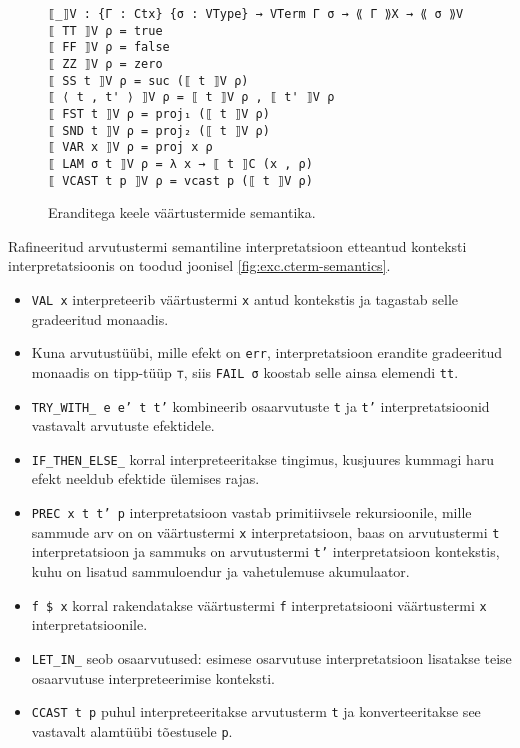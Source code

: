 \documentclass[a4paper,12pt]{article}
\begin{document}
\begin{figure}
  \begin{BVerbatim}
⟦_⟧V : {Γ : Ctx} {σ : VType} → VTerm Γ σ → ⟪ Γ ⟫X → ⟪ σ ⟫V
⟦ TT ⟧V ρ = true
⟦ FF ⟧V ρ = false
⟦ ZZ ⟧V ρ = zero
⟦ SS t ⟧V ρ = suc (⟦ t ⟧V ρ)
⟦ ⟨ t , t' ⟩ ⟧V ρ = ⟦ t ⟧V ρ , ⟦ t' ⟧V ρ
⟦ FST t ⟧V ρ = proj₁ (⟦ t ⟧V ρ)
⟦ SND t ⟧V ρ = proj₂ (⟦ t ⟧V ρ)
⟦ VAR x ⟧V ρ = proj x ρ
⟦ LAM σ t ⟧V ρ = λ x → ⟦ t ⟧C (x , ρ)
⟦ VCAST t p ⟧V ρ = vcast p (⟦ t ⟧V ρ)
  \end{BVerbatim}
  \caption{Eranditega keele väärtustermide semantika.}
  \label{fig:exc.vterm-semantics}
\end{figure}

Rafineeritud arvutustermi semantiline interpretatsioon etteantud konteksti interpretatsioonis on toodud joonisel \ref{fig:exc.cterm-semantics}.
\begin{itemize}
\item {\tt VAL x} interpreteerib väärtustermi {\tt x} antud kontekstis ja tagastab selle gradeeritud monaadis.
\item Kuna arvutustüübi, mille efekt on {\tt err}, interpretatsioon erandite gradeeritud monaadis on tipp-tüüp {\tt ⊤}, siis {\tt FAIL σ} koostab selle ainsa elemendi {\tt tt}.
\item {\tt TRY_WITH_ {e} {e'} t t'} kombineerib osaarvutuste {\tt t} ja {\tt t'} interpretatsioonid vastavalt arvutuste efektidele. 
\item {\tt IF_THEN_ELSE_} korral interpreteeritakse tingimus, kusjuures kummagi haru efekt neeldub efektide ülemises rajas.
\item {\tt PREC x t t' p} interpretatsioon vastab primitiivsele rekursioonile, mille sammude arv on on väärtustermi {\tt x} interpretatsioon, baas on arvutustermi {\tt t} interpretatsioon ja sammuks on arvutustermi {\tt t'} interpretatsioon kontekstis, kuhu on lisatud sammuloendur ja vahetulemuse akumulaator. 
\item {\tt f \$ x} korral rakendatakse väärtustermi {\tt f} interpretatsiooni väärtustermi {\tt x} interpretatsioonile.
\item {\tt LET_IN_} seob osaarvutused: esimese osarvutuse interpretatsioon lisatakse teise osaarvutuse interpreteerimise konteksti.
\item {\tt CCAST t p} puhul interpreteeritakse arvutusterm {\tt t} ja konverteeritakse see vastavalt alamtüübi tõestusele {\tt p}.
\end{itemize}
\end{document}
